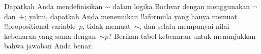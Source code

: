 \documentclass[../../../include/open-logic-section]{subfiles}
\begin{document}
\begin{prob}
  Dapatkah Anda mendefinisikan $\sim$ dalam logika Bochvar dengan menggunakan
  $\lnot$ dan~$+$; yakni, dapatkah Anda menemukan !!a{formula} yang hanya
  memuat !!{propositional variable}~$p$, tidak memuat~$\sim$, dan selalu
  mempunyai nilai kebenaran yang sama dengan~$\mathord{\sim}p$? Berikan tabel
  kebenaran untuk menunjukkan bahwa jawaban Anda benar.
\end{prob}
\end{document}
